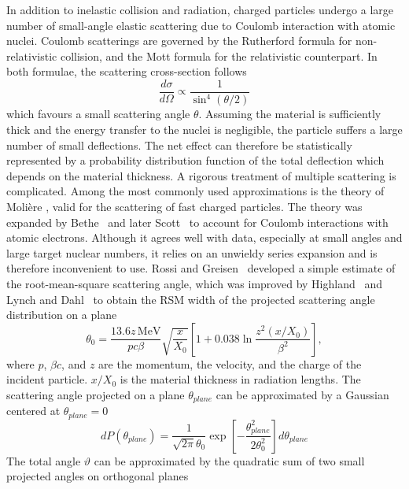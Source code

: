 In addition to inelastic collision and radiation, charged particles undergo a large number of small-angle elastic scattering due to Coulomb interaction with atomic nuclei. 
Coulomb scatterings are governed by the Rutherford formula for non-relativistic collision, and the Mott formula for the relativistic counterpart. 
In both formulae, the scattering cross-section follows 
\begin{equation}
    \label{eq:6.13}
    \frac{d\sigma}{d\Omega} \propto \frac{1}{\sin^4 (\theta/2)}
\end{equation}
which favours a small scattering angle $\theta$. Assuming the material is sufficiently thick and the energy transfer to the nuclei is negligible, the particle suffers a large number of small deflections.
The net effect can therefore be statistically represented by a probability distribution function of the total deflection which depends on the material thickness. 
A rigorous treatment of multiple scattering is complicated. 
Among the most commonly used approximations is the theory of Molière \cite{Moliere:1947, Moliere:1948zz}, valid for the scattering of fast charged particles. 
The theory was expanded by Bethe~\cite{bethe:1953} and later Scott~\cite{scott:1963} to account for Coulomb interactions with atomic electrons. 
Although it agrees well with data, especially at small angles and large target nuclear numbers, it relies on an unwieldy series expansion and is therefore inconvenient to use. 
Rossi and Greisen~\cite{Rossi_Greisen_1941} developed a simple estimate of the root-mean-square scattering angle, which was improved by Highland~\cite{Highland_1975} and Lynch and Dahl~\cite{Lynch_Dahl_1991} to obtain the RSM width of the projected scattering angle distribution on a plane
\begin{equation}
\label{eq:6.14}
    \theta_0 = \frac{13.6z\, \mathrm{MeV}}{pc\beta} \sqrt{\frac{x}{X_0}}\left[ 1 + 0.038\ln \frac{z^2(x/X_0)}{\beta^2} \right],
\end{equation}
where $p$, $\beta c$, and $z$ are the momentum, the velocity, and the charge of the incident particle. $x/X_0$ is the material thickness in radiation lengths. 
The scattering angle projected on a plane $\theta_{plane}$ can be approximated by a Gaussian centered at $\theta_{plane}=0$
\begin{equation}
    \label{eq:6.15}
    d P(\theta_{plane}) = \frac{1}{\sqrt{2\pi} \theta_0} \exp \left[ - \frac{\theta_{plane}^2}{2\theta_0^2} \right] d\theta_{plane}
\end{equation}
The total angle $\vartheta$ can be approximated by the quadratic sum of two small projected angles on orthogonal planes

